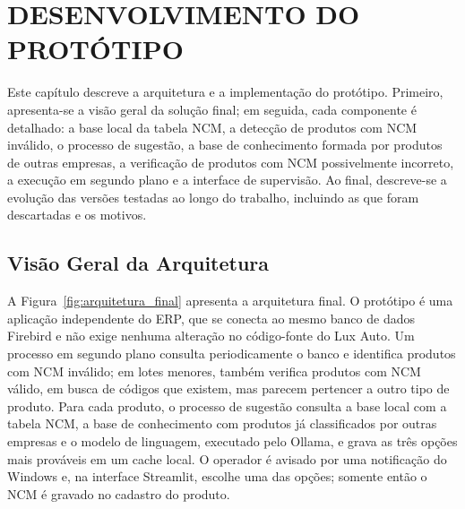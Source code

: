 \chapter{DESENVOLVIMENTO DO PROTÓTIPO}
\label{cap:desenvolvimento}

Este capítulo descreve a arquitetura e a implementação do protótipo. Primeiro, apresenta-se a visão geral da solução final; em seguida, cada componente é detalhado: a base local da tabela NCM, a detecção de produtos com NCM inválido, o processo de sugestão, a base de conhecimento formada por produtos de outras empresas, a verificação de produtos com NCM possivelmente incorreto, a execução em segundo plano e a interface de supervisão. Ao final, descreve-se a evolução das versões testadas ao longo do trabalho, incluindo as que foram descartadas e os motivos.

\section{Visão Geral da Arquitetura}

A Figura~\ref{fig:arquitetura_final} apresenta a arquitetura final. O protótipo é uma aplicação independente do ERP, que se conecta ao mesmo banco de dados Firebird e não exige nenhuma alteração no código-fonte do Lux Auto. Um processo em segundo plano consulta periodicamente o banco e identifica produtos com NCM inválido; em lotes menores, também verifica produtos com NCM válido, em busca de códigos que existem, mas parecem pertencer a outro tipo de produto. Para cada produto, o processo de sugestão consulta a base local com a tabela NCM, a base de conhecimento com produtos já classificados por outras empresas e o modelo de linguagem, executado pelo Ollama, e grava as três opções mais prováveis em um cache local. O operador é avisado por uma notificação do Windows e, na interface Streamlit, escolhe uma das opções; somente então o NCM é gravado no cadastro do produto.

